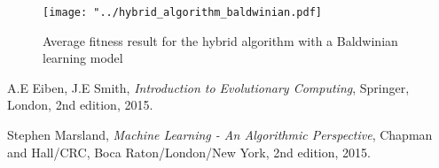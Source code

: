 \documentclass{article}
\begin{document}
\begin{figure}[H]
\begin{center}
\texttt{[image: "../hybrid\_algorithm\_baldwinian.pdf]}
\caption{Average fitness result for the hybrid algorithm with a Baldwinian learning model}
\end{center}
\end{figure}

\begin{thebibliography}{9}

  A.E Eiben, J.E Smith,
  \textit{Introduction to Evolutionary Computing},
  Springer, London,
  2nd edition,
  2015.
  
  Stephen Marsland,
  \textit{Machine Learning - An Algorithmic Perspective},
  Chapman and Hall/CRC, Boca Raton/London/New York,
  2nd edition,
  2015.

\end{thebibliography}
\end{document}
